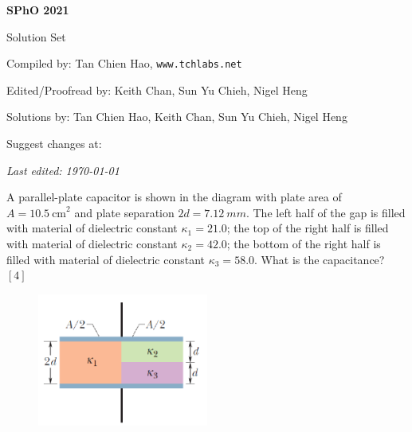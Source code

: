 \def\sphoyear{2021}
\setcounter{section}{0}
\setcounter{solcounter}{0}

\fancyhead[L]{\textbf{SPhO \sphoyear}} 


\begin{titlepage}
\centering

{\Huge\bfseries SPhO \sphoyear}

\vspace{1cm}

{\LARGE Solution Set}

\vspace{2cm}

{\Large Compiled by: Tan Chien Hao, \texttt{www.tchlabs.net}}

\vspace{2cm}

{\Large Edited/Proofread by: Keith Chan, Sun Yu Chieh, Nigel Heng}

\vspace{2cm}

{\Large Solutions by: Tan Chien Hao, Keith Chan, Sun Yu Chieh, Nigel Heng}

\vspace{2cm}

{\large Suggest changes at: \github}


\vfill

{\itshape Last edited: \today}
\end{titlepage}


\begin{problem}
    A parallel-plate capacitor is shown in the diagram with plate area of $A = \qty{10.5}{\cm}^2$ and plate separation $2d = \qty{7.12}{mm}$. The left half of the gap is filled with material of dielectric constant $\kappa_1 = 21.0$; the top of the right half is filled with material of dielectric constant $\kappa_2 = 42.0$; the bottom of the right half is filled with material of dielectric constant $\kappa_3 = 58.0$. What is the capacitance? \hfill $[4]$
    \begin{figure}[H]
        \centering
        \includegraphics[width=0.5\textwidth]{spho_book_TYS_images/2021SPhO_1.png}
        \label{fig:1}
    \end{figure}
\end{problem}

